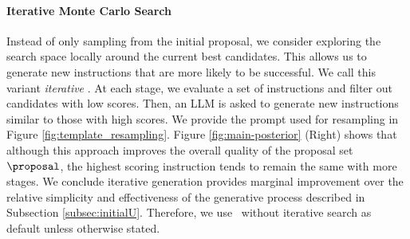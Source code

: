\paragraph{Iterative Monte Carlo Search}
Instead of only sampling from the initial proposal, we consider exploring the search space locally around the current best candidates. This allows us to generate new instructions that are more likely to be successful. We call this variant \textit{iterative \algname}. 
At each stage, we evaluate a set of instructions and filter out candidates with low scores. Then, an LLM is asked to generate new instructions similar to those with high scores. We provide the prompt used for resampling in Figure \ref{fig:template_resampling}. 
Figure \ref{fig:main-posterior} (Right) shows that although this approach improves the overall quality of the proposal set $\proposal$, the highest scoring instruction tends to remain the same with more stages. We conclude iterative generation provides marginal improvement over the relative simplicity and effectiveness of the generative process described in Subsection \ref{subsec:initialU}. Therefore, we use \algname~without iterative search as default unless otherwise stated.